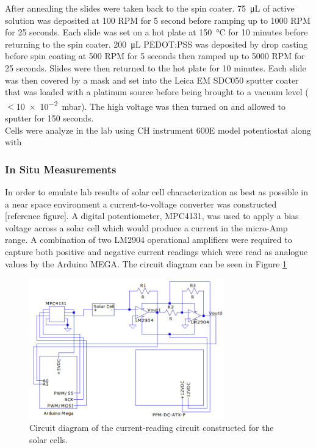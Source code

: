 	After annealing the slides were taken back to the spin coater. \SI{75}{\micro\liter} of active solution was deposited at 100 RPM for 5 second before ramping up to 1000 RPM for 25 seconds. Each slide was set on a hot plate at \SI{150}{\celsius} for 10 minutes before returning to the spin coater. \SI{200}{\micro\liter} PEDOT:PSS was deposited by drop casting before spin coating at 500 RPM for 5 seconds then ramped up to 5000 RPM for 25 seconds. Slides were then returned to the hot plate for 10 minutes. Each slide was then covered by a mask and set into the Leica EM SDC050 sputter coater that was loaded with a platinum source before being brought to a vacuum level ($<$\SI{10e-2}{\milli\bar}). The high voltage was then turned on and allowed to sputter for 150 seconds. \\
	
	Cells were analyze in the lab using CH instrument 600E model potentiostat along with 

	
\subsubsection{In Situ Measurements}

In order to emulate lab results of solar cell characterization as best as possible in a near space environment a current-to-voltage converter was constructed [reference figure]. A digital potentiometer, MPC4131, was used to apply a bias voltage across a solar cell which would produce a current in the micro-Amp range. A combination of two LM2904 operational amplifiers were required to capture both positive and negative current readings which were read as analogue values by the Arduino MEGA. The circuit diagram can be seen in Figure \ref{fig:solar-cell-circuit}

\begin{figure}[h!]
	\begin{center}
		\includegraphics[width=0.75\textwidth]{figures/solar-cell-circuit-diagram.png}
		\caption{Circuit diagram of the current-reading circuit constructed for the solar cells.}
		\label{fig:solar-cell-circuit}
	\end{center}
\end{figure}
